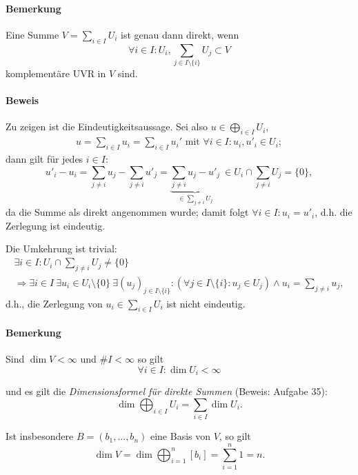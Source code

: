 \paragraph{Bemerkung}
	Eine Summe $ V = \sum_{i\in I} U_i $ ist genau dann direkt, wenn
		\[
		\forall i\in I: U_i, \sum_{j\in I\setminus\{i\}}U_j \subset V
		\]
	komplementäre UVR in $ V $ sind.

\paragraph{Beweis}
	Zu zeigen ist die Eindeutigkeitsaussage. Sei also $ u \in \bigoplus_{i\in I}U_i $,
		\begin{gather*}
		u = \sum_{i\in I} u_i = \sum_{i\in I} u_i' \text{ mit } \forall i\in I: u_i,u'_i\in U_i;
		\end{gather*}
	dann gilt für jedes $ i\in I$:
		\[
		u'_i-u_i = \sum _{j\neq i}u_j-\sum_{j\neq i} u'_j = \underbrace{\sum_{j\neq i}u_j-u'_j}_{\in \sum_{j\neq i}U_j}\ \in U_i\cap \sum_{j\neq i} U_j = \{0\},
		\]
	da die Summe als direkt angenommen wurde; damit folgt $ \forall i \in I: u_i = u'_i $, d.h. die Zerlegung ist eindeutig.
	
	Die Umkehrung ist trivial:
		\begin{gather*}
		\exists i\in I:U_i\cap \sum_{j\neq i} U_j \neq \{0\}\\
		\Rightarrow \exists i\in I\ \exists u_i\in U_i\setminus\{0\}\ \exists (u_j)_{j\in I\setminus\{i\}}:
		(\forall j\in I\setminus\{i\}:u_j \in U_j)\land u_i = \sum_{j\neq i} u_j,
		\end{gather*}
	d.h., die Zerlegung von $ u_i\in \sum_{i\in I}U_i $ ist nicht eindeutig.

\paragraph{Bemerkung}
	Sind $ \dim V <\infty $ und $ \# I < \infty $ so gilt
		\begin{equation*}
		\forall i\in I: \dim U_i < \infty
		\end{equation*}
		
	und es gilt die \emph{Dimensionsformel für direkte Summen} (Beweis: Aufgabe 35):
		\begin{equation*}
		\dim \bigoplus_{i\in I}U_i = \sum_{i\in I} \dim U_i.
		\end{equation*}
	
	Ist insbesondere $ B=(b_1,...,b_n) $ eine Basis von $ V $, so gilt
		\begin{equation*}
		\dim V = \dim \bigoplus_{i=1}^n [b_i]=\sum_{i=1}^{n}1 = n.
		\end{equation*}
		
